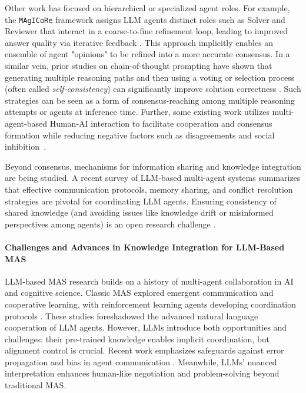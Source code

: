 Other work has focused on hierarchical or specialized agent roles. For example, the \texttt{MAgICoRe} framework assigns LLM agents distinct roles such as Solver and Reviewer that interact in a coarse-to-fine refinement loop, leading to improved answer quality via iterative feedback \cite{Chen2024magicore}. This approach implicitly enables an ensemble of agent "opinions" to be refined into a more accurate consensus. In a similar vein, prior studies on chain-of-thought prompting have shown that generating multiple reasoning paths and then using a voting or selection process (often called \emph{self-consistency}) can significantly improve solution correctness \cite{Wang2023selfconsistency}. Such strategies can be seen as a form of consensus-reaching among multiple reasoning attempts or agents at inference time. Further, some existing work utilizes multi-agent-based Human-AI interaction to facilitate cooperation and consensus formation while reducing negative factors such as disagreements and social inhibition~\cite{nomura2024towards}.

Beyond consensus, mechanisms for information sharing and knowledge integration are being studied. A recent survey of LLM-based multi-agent systems \cite{Guo2024survey} summarizes that effective communication protocols, memory sharing, and conflict resolution strategies are pivotal for coordinating LLM agents. Ensuring consistency of shared knowledge (and avoiding issues like knowledge drift or misinformed perspectives among agents) is an open research challenge \cite{zhang-etal-2024-exploring,Guo2024survey}.

\paragraph{Challenges and Advances in Knowledge Integration for LLM-Based MAS} LLM-based MAS research builds on a history of multi-agent collaboration in AI and cognitive science. Classic MAS explored emergent communication and cooperative learning, with reinforcement learning agents developing coordination protocols \cite{Foerster2016communicate}. These studies foreshadowed the advanced natural language cooperation of LLM agents. However, LLMs introduce both opportunities and challenges: their pre-trained knowledge enables implicit coordination, but alignment control is crucial. Recent work emphasizes safeguards against error propagation and bias in agent communication \cite{wang-etal-2024-rethinking-bounds,Guo2024survey}. Meanwhile, LLMs' nuanced interpretation enhances human-like negotiation and problem-solving beyond traditional MAS.


